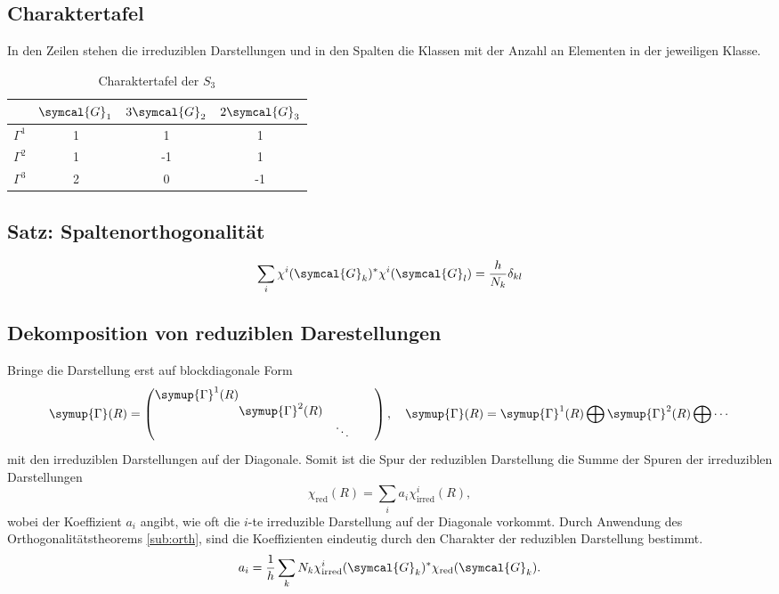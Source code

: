 \documentclass[
  captions=tableheading,  %
  titlepage=firstiscover, %
]{scrartcl}
\begin{document}
\subsection{Charaktertafel}
In den Zeilen stehen die irreduziblen Darstellungen und in den Spalten die Klassen mit 
der Anzahl an Elementen in der jeweiligen Klasse.
\begin{table}
  \centering
  \caption{Charaktertafel der $S_3$}
  \label{tab:some_data}
  \begin{tabular}{S[table-format=10.0] S[table-format = 1.0] S S}
  \toprule
   & {$\symcal{G}_1$} & {$3\symcal{G}_2$} & {$2\symcal{G}_3$} \\
  \midrule
  {$\Gamma^1$} & 1 & 1  & 1   \\
  {$\Gamma^2$} & 1 & -1 & 1   \\
  {$\Gamma^3$} & 2 & 0  & -1  \\
  \bottomrule
  \end{tabular}
  \end{table}
\subsection{Satz: Spaltenorthogonalität}
\begin{equation*}
  \sum_i \chi^i(\symcal{G}_k)^* \chi^i(\symcal{G}_l) = \frac{h}{N_k} \delta_{kl}
\end{equation*}
\subsection{Dekomposition von reduziblen Darestellungen}
Bringe die Darstellung erst auf blockdiagonale Form
\begin{equation*}
  \symup{\Gamma} (R) = 
  \begin{pmatrix}
    \symup{\Gamma}^1 (R)  &       &    \\
    & \!\!\!\!\!\! \symup{\Gamma}^2(R) &  \\
    & & \ddots \quad \quad
  \end{pmatrix}
  , \quad \symup{\Gamma} (R) = \symup{\Gamma}^1 (R)\bigoplus \symup{\Gamma}^2(R) \bigoplus \cdots
\end{equation*}
mit den irreduziblen Darstellungen auf der Diagonale.
Somit ist die Spur der reduziblen Darstellung die Summe der Spuren der irreduziblen Darstellungen
\begin{equation*}
  \chi_{\text{red}} (R) = \sum_i a_i \chi_{\text{irred}}^i(R),
\end{equation*}
wobei der Koeffizient $a_i$ angibt, wie oft die $i$-te irreduzible Darstellung auf der 
Diagonale vorkommt.
Durch Anwendung des Orthogonalitätstheorems \ref{sub:orth}, sind die Koeffizienten eindeutig 
durch den Charakter der reduziblen Darstellung bestimmt.
\begin{equation*}
  a_i = \frac{1}{h} \sum_k N_k \chi_{\text{irred}}^i (\symcal{G}_k)^* \chi_{\text{red}} (\symcal{G}_k) . \label{eqn:decomp}
\end{equation*}
\end{document}
